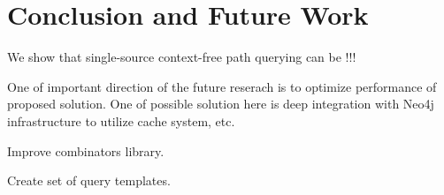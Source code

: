 \section{Conclusion and Future Work}

We show that single-source context-free path querying can be !!!

One of important direction of the future reserach is to optimize performance of proposed solution.
One of possible solution here is deep integration with Neo4j infrastructure to utilize cache system, etc.

Improve combinators library.



Create set of query templates.
